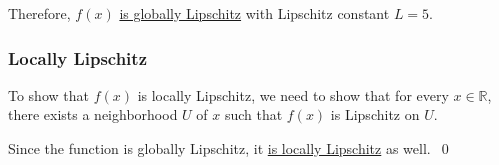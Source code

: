 Therefore, \( f(x) \) \underline{is globally Lipschitz} with Lipschitz constant \( L = 5 \).

\subsubsection*{Locally Lipschitz}

To show that \( f(x) \) is locally Lipschitz, we need to show that for every \( x \in \mathbb{R} \), there exists a neighborhood \( U \) of \( x \) such that \( f(x) \) is Lipschitz on \( U \).

Since the function is globally Lipschitz, it \underline{is locally Lipschitz} as well.~\qed

